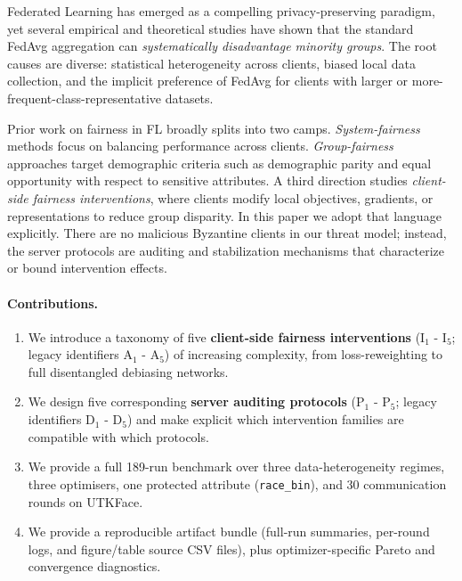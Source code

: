 ﻿\documentclass{article}
\begin{document}
Federated Learning has
emerged as a compelling privacy-preserving paradigm, yet several
empirical and theoretical studies have shown that the standard
FedAvg aggregation can \emph{systematically disadvantage minority
groups}.
The root causes are diverse: statistical heterogeneity across
clients, biased local data
collection, and the implicit
preference of FedAvg for clients with larger or
more-frequent-class-representative datasets.

Prior work on fairness in FL broadly splits into two camps.
\emph{System-fairness} methods focus on balancing performance across
clients.
\emph{Group-fairness} approaches target demographic criteria such as
demographic parity and equal opportunity with respect to sensitive
attributes.
A third direction studies \emph{client-side fairness interventions},
where clients modify local objectives, gradients, or representations to
reduce group disparity.
In this paper we adopt that language explicitly.
There are no malicious Byzantine clients in our threat model; instead,
the server protocols are auditing and stabilization mechanisms that
characterize or bound intervention effects.

\paragraph{Contributions.}
\begin{enumerate}[leftmargin=1.5em,itemsep=0pt]
  \item We introduce a taxonomy of five \textbf{client-side fairness
    interventions} ($\mathrm{I}_1$ - $\mathrm{I}_5$; legacy
    identifiers $\mathrm{A}_1$ - $\mathrm{A}_5$) of increasing
        complexity, from loss-reweighting to full disentangled
        debiasing networks.
  \item We design five corresponding \textbf{server auditing
    protocols} ($\mathrm{P}_1$ - $\mathrm{P}_5$; legacy identifiers
    $\mathrm{D}_1$ - $\mathrm{D}_5$) and make explicit which
    intervention families are compatible with which protocols.
  \item We provide a full 189-run benchmark over three
    data-heterogeneity regimes, three optimisers, one protected
    attribute (\texttt{race\_bin}), and 30 communication rounds on
    UTKFace.
  \item We provide a reproducible artifact bundle (full-run summaries,
    per-round logs, and figure/table source CSV files), plus
    optimizer-specific Pareto and convergence diagnostics.
\end{enumerate}
\end{document}
